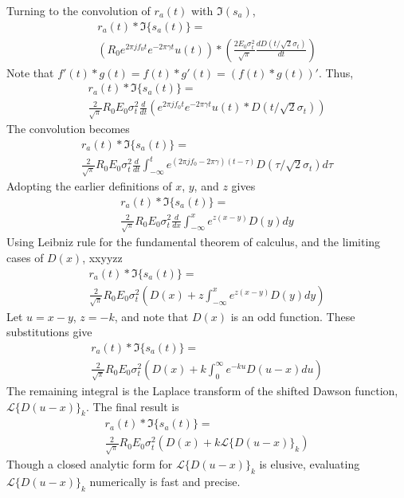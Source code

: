 \documentclass[amsmath,amssymb,aps,prd,10pt,twocolumn,showkeys]{revtex4}
\begin{document}
Turning to the convolution of $r_a(t)$ with $\Im(s_a)$,
\begin{multline}
r_a(t) * \Im\lbrace s_a(t) \rbrace = \\ \left(R_0 e^{2\pi j f_0 t} e^{-2\pi \gamma t} u(t)\right) * \left(\frac{2 E_0 \sigma_t^2}{\sqrt{\pi}}\frac{dD(t/\sqrt{2}\sigma_t)}{dt} \right)
\end{multline}
Note that $f'(t) * g(t) = f(t) * g'(t) = (f(t) * g(t))'$.  Thus,
\begin{multline}
r_a(t) * \Im\lbrace s_a(t) \rbrace = \\ \frac{2}{\sqrt{\pi}} R_0 E_0 \sigma_t^2 \frac{d}{dt}\left(e^{2\pi j f_0 t}e^{-2\pi\gamma t} u(t) * D(t/\sqrt{2}\sigma_t) \right)
\end{multline}
The convolution becomes
\begin{multline}
r_a(t) * \Im\lbrace s_a(t) \rbrace = \\ \frac{2}{\sqrt{\pi}} R_0 E_0 \sigma_t^2 \frac{d}{dt} \int_{-\infty}^{t} e^{(2\pi j f_0 - 2\pi\gamma)(t-\tau)}D(\tau/\sqrt{2}\sigma_t)d\tau
\end{multline}
Adopting the earlier definitions of $x$, $y$, and $z$ gives
\begin{multline}
r_a(t) * \Im\lbrace s_a(t) \rbrace = \\ \frac{2}{\sqrt{\pi}} R_0 E_0 \sigma_t^2 \frac{d}{dx} \int_{-\infty}^{x} e^{z(x-y)} D(y) dy
\end{multline}
Using Leibniz rule for the fundamental theorem of calculus, and the limiting cases of $D(x)$, xxyyzz
\begin{multline}
r_a(t) * \Im\lbrace s_a(t) \rbrace = \\ \frac{2}{\sqrt{\pi}} R_0 E_0 \sigma_t^2 \left(D(x) + z\int_{-\infty}^{x} e^{z(x-y)} D(y) dy \right)
\end{multline}
Let $u = x-y$, $z=-k$, and note that $D(x)$ is an odd function.  These substitutions give
\begin{multline}
r_a(t) * \Im\lbrace s_a(t) \rbrace = \\ \frac{2}{\sqrt{\pi}} R_0 E_0 \sigma_t^2 \left(D(x) + k\int_{0}^{\infty} e^{-ku} D(u-x) du \right)
\end{multline}
The remaining integral is the Laplace transform of the shifted Dawson function, $\mathcal{L}\lbrace D(u-x)\rbrace_k$.  The final result is
\begin{multline}
r_a(t) * \Im\lbrace s_a(t) \rbrace = \\ \frac{2}{\sqrt{\pi}} R_0 E_0 \sigma_t^2 \left(D(x) + k\mathcal{L}\lbrace D(u-x)\rbrace_k\right) \label{eq:Im_result}
\end{multline}
Though a closed analytic form for $\mathcal{L}\lbrace D(u-x)\rbrace_k$ is elusive, evaluating $\mathcal{L}\lbrace D(u-x)\rbrace_k$ numerically is fast and precise.
\end{document}
